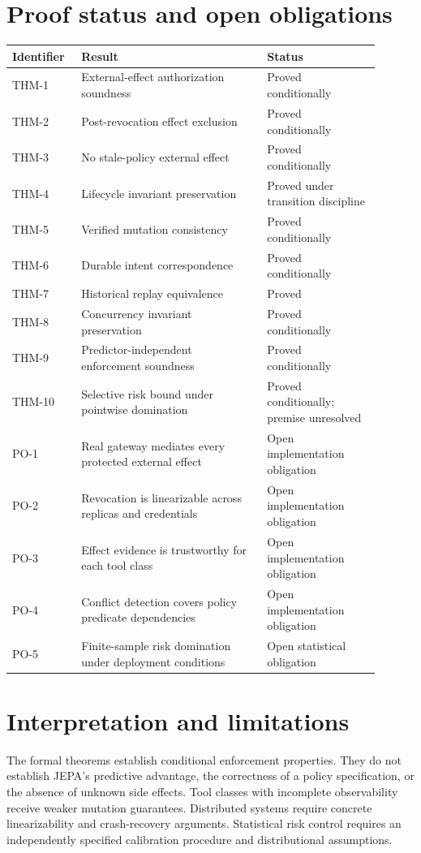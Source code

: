 \documentclass[11pt,a4paper]{article}
\theoremstyle{remark}
\begin{document}
\section{Proof status and open obligations}

\begin{longtable}{p{0.15\linewidth}p{0.46\linewidth}p{0.29\linewidth}}
\toprule
Identifier & Result & Status\\
\midrule
THM-1 & External-effect authorization soundness & Proved conditionally\\
THM-2 & Post-revocation effect exclusion & Proved conditionally\\
THM-3 & No stale-policy external effect & Proved conditionally\\
THM-4 & Lifecycle invariant preservation & Proved under transition discipline\\
THM-5 & Verified mutation consistency & Proved conditionally\\
THM-6 & Durable intent correspondence & Proved conditionally\\
THM-7 & Historical replay equivalence & Proved\\
THM-8 & Concurrency invariant preservation & Proved conditionally\\
THM-9 & Predictor-independent enforcement soundness & Proved conditionally\\
THM-10 & Selective risk bound under pointwise domination & Proved conditionally; premise unresolved\\
PO-1 & Real gateway mediates every protected external effect & Open implementation obligation\\
PO-2 & Revocation is linearizable across replicas and credentials & Open implementation obligation\\
PO-3 & Effect evidence is trustworthy for each tool class & Open implementation obligation\\
PO-4 & Conflict detection covers policy predicate dependencies & Open implementation obligation\\
PO-5 & Finite-sample risk domination under deployment conditions & Open statistical obligation\\
\bottomrule
\end{longtable}

\section{Interpretation and limitations}

The formal theorems establish conditional enforcement properties. They do not establish JEPA's predictive advantage, the correctness of a policy specification, or the absence of unknown side effects. Tool classes with incomplete observability receive weaker mutation guarantees. Distributed systems require concrete linearizability and crash-recovery arguments. Statistical risk control requires an independently specified calibration procedure and distributional assumptions.
\end{document}
